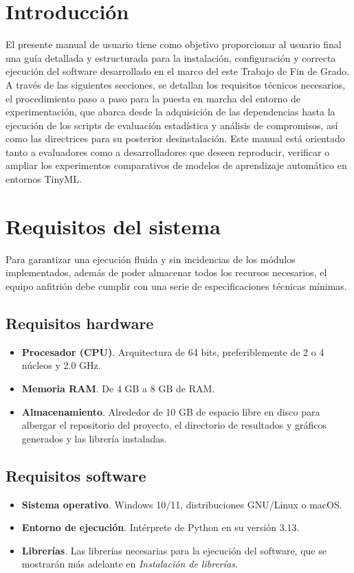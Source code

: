 \documentclass[a4paper,12pt,twoside,final]{book}
\begin{document}
\section{Introducción}
El presente manual de usuario tiene como objetivo proporcionar al usuario final una guía detallada y estructurada para
la instalación, configuración y correcta ejecución del software desarrollado en el marco del este Trabajo de Fin de
Grado. A través de las siguientes secciones, se detallan los requisitos técnicos necesarios, el procedimiento paso a
paso para la puesta en marcha del entorno de experimentación, que abarca desde la adquisición de las dependencias hasta
la ejecución de los scripts de evaluación estadística y análisis de compromisos, así como las directrices para su
posterior desinstalación. Este manual está orientado tanto a evaluadores como a desarrolladores que deseen reproducir,
verificar o ampliar los experimentos comparativos de modelos de aprendizaje automático en entornos TinyML.

\section{Requisitos del sistema}
Para garantizar una ejecución fluida y sin incidencias de los módulos implementados, además de poder almacenar todos los
recursos necesarios, el equipo anfitrión debe cumplir con una serie de especificaciones técnicas mínimas.

\subsection{Requisitos hardware}
\begin{itemize}
    \item \textbf{Procesador (CPU)}. Arquitectura de 64 bits, preferiblemente de 2 o 4 núcleos y
    2.0 GHz.
    \item \textbf{Memoria RAM}. De 4 GB a 8 GB de RAM.
    \item \textbf{Almacenamiento}. Alrededor de 10 GB de espacio libre en disco para albergar el repositorio del
    proyecto, el directorio de resultados y gráficos generados y las librería instaladas.
\end{itemize}

\subsection{Requisitos software}
\begin{itemize}
    \item \textbf{Sistema operativo}. Windows 10/11, distribuciones GNU/Linux o macOS.
    \item \textbf{Entorno de ejecución}. Intérprete de Python en su versión 3.13.
    \item \textbf{Librerías}. Las librerías necesarias para la ejecución del software, que se mostrarán más adelante en 
    \textit{Instalación de librerías}.
\end{itemize}
\end{document}
